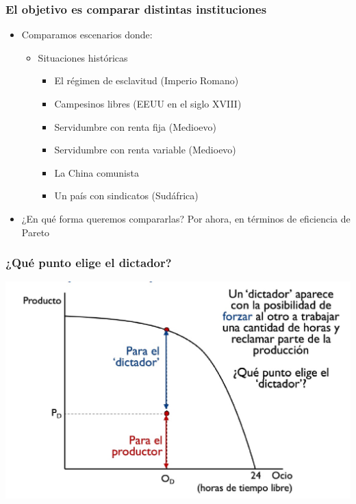 \documentclass{beamer}
\begin{document}
\begin{frame}
\frametitle{El objetivo es comparar distintas instituciones}
\begin{itemize}
        \item Comparamos escenarios donde:\vspace{2mm}
            \begin{itemize}
            \item Situaciones históricas\vspace{2mm}
            \begin{itemize}
            \item El régimen de esclavitud (Imperio Romano)\vspace{2mm}
            \item Campesinos libres (EEUU en el siglo XVIII)\vspace{2mm}
            \item Servidumbre con renta fija (Medioevo)\vspace{2mm}
            \item Servidumbre con renta variable (Medioevo)\vspace{2mm}
            \item La China comunista \vspace{2mm}
            \item Un país con sindicatos (Sudáfrica)\vspace{2mm}
            \end{itemize}
        \end{itemize}\vspace{4mm}
    \item ¿En qué forma queremos compararlas? Por ahora, en términos de eficiencia de Pareto
\end{itemize}
\end{frame}

\begin{frame}
\frametitle{¿Qué punto elige el dictador?}
\centering
\includegraphics[scale=0.4]{../Figures/Tema_04.7_modcap4_2.jpg}\end{frame}
\end{document}

